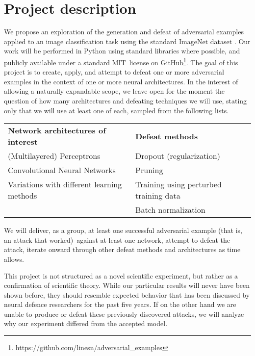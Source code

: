 \documentclass{amsproc}
\theoremstyle{definition}
\numberwithin{equation}{section}
\begin{document}

\section{Project description}

We propose an exploration of the generation and defeat of adversarial
examples applied to an image classification task using the standard ImageNet
dataset \cite{imagenet_cvpr09}. Our work will be performed in Python using
standard libraries where possible, and publicly available under a standard
MIT\ license on GitHub\footnote{%
https://github.com/linesn/adversarial\_examples}. The goal of this project
is to create, apply, and attempt to defeat one or more adversarial examples
in the context of one or more neural architectures. In the interest of
allowing a naturally expandable scope, we leave open for the moment the
question of how many architectures and defeating techniques we will use,
stating only that we will use at least one of each, sampled from the
following lists.

\bigskip 

\begin{tabular}{ll}
\textbf{Network architectures of interest} & \textbf{Defeat methods} \\ 
(Multilayered) Perceptrons & Dropout (regularization) \\ 
Convolutional Neural Networks & Pruning \\ 
Variations with different learning methods & Training using perturbed
training data \\ 
& Batch normalization%
\end{tabular}

\bigskip 

We will deliver, as a group, at least one successful adversarial example
(that is, an attack that worked)\ against at least one network, attempt to
defeat the attack, iterate onward through other defeat methods and
architectures as time allows. 

This project is not structured as a novel scientific experiment, but rather
as a confirmation of scientific theory. While our particular results will
never have been shown before, they should resemble expected behavior that
has been discussed by neural defence researchers for the past five years. If
on the other hand we are unable to produce or defeat these previously
discovered attacks, we will analyze why our experiment differed from the
accepted model.
\end{document}
